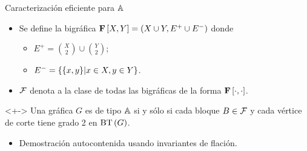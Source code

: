 \documentclass[spanish]{beamer}
\begin{document}
\begin{frame}{Caracterización eficiente para $\mathbb{A}$}
  \begin{definition}
    \begin{itemize}[<+->]
      \item Se define la bigráfica $\mathbf{F}\left[{X}, {Y}\right] = \left({X \cup Y, E^+ \cup 
      E^-}\right)$ donde
      \begin{itemize}[<+->]
        \item $E^+ = \binom{X}{2} \cup \binom{Y}{2}$;
        \item $E^- = \left\{ \left\{{x, y}\right\} \middle| x \in X, y \in Y \right\}$.
      \end{itemize}
      \item $\mathcal{F}$ denota a la clase de todas las bigráficas de la forma 
      $\mathbf{F}\left[{\cdot}, {\cdot}\right]$.
    \end{itemize}
  \end{definition}
  \begin{theorem}<+->
    Una gráfica $G$ es de tipo $\mathbb{A}$ si y sólo si cada bloque $B \in \mathcal{F}$ 
    y cada vértice de corte tiene grado 2 en $\mathrm{BT}\left(G\right)$.
  \end{theorem}
  \begin{itemize}[<+->]
    \item Demostración autocontenida usando invariantes de flación.
  \end{itemize}
\end{frame}
\end{document}
